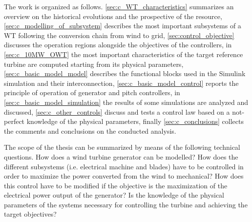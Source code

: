 The work is organized as follows. \autoref{sec:c_WT_characteristics} summarizes an overview on the historical evolutions and the prospective of the resource, \autoref{sec:c_modelling_of_subsystem} describes the most important subsystems of a WT following the conversion chain from wind to grid, \autoref{sec:control_objective} discusses the operation regions alongside the objectives of the controllers, in \autoref{sec:c_10MW_OWT} the most important characteristics of the target reference turbine are computed starting from its physical parameters, \autoref{sec:c_basic_model_model} describes the functional blocks used in the Simulink simulation and their interconnection, \autoref{sec:c_basic_model_control} reports the principle of operation of generator and pitch controllers, in \autoref{sec:c_basic_model_simulation} the results of some simulations are analyzed and discussed, \autoref{sec:c_other_controls} discuss and tests a control law based on a not-perfect knowledge of the physical parameters, finally \autoref{sec:c_conclusions} collects the comments and conclusions on the conducted analysis.

The scope of the thesis can be summarized by means of the following technical questions. How does a wind turbine generator can be modelled? How does the different subsystems (i.e. electrical machine and blades) have to be controlled in order to maximize the power converted from the wind to mechanical? How does this control have to be modified if the objective is the maximization of the electrical power output of the generator? Is the knowledge of the physical parameters of the systems necessary for controlling the turbine and achieving the target objectives? 

